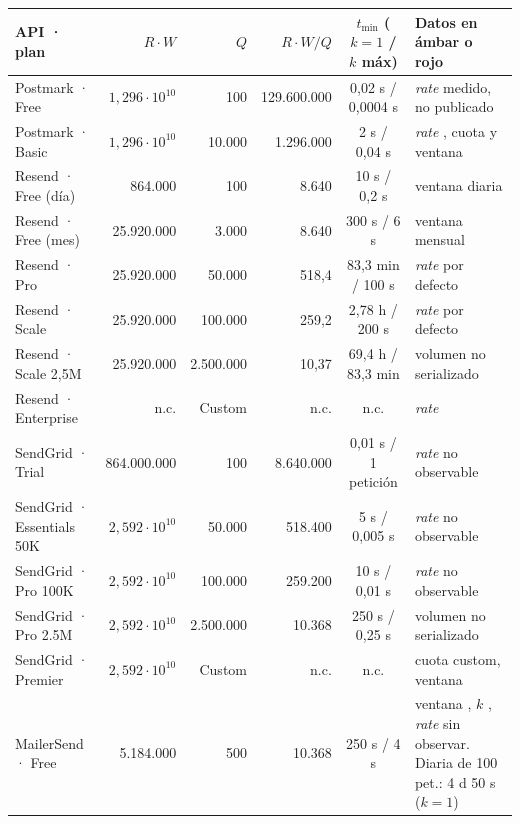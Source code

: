 \begin{table}[H]
\centering
\scriptsize
\setlength{\tabcolsep}{3pt}
\begin{tabular}{|l|r|r|r|c|p{3.2cm}|}
\hline
\textbf{API · plan} & \textbf{$R \cdot W$} & \textbf{$Q$} & \textbf{$R \cdot W / Q$} & \textbf{$t_{\min}$ ($k{=}1$ / $k$ máx)} & \textbf{Datos en ámbar o rojo} \\
\hline
Postmark · Free & $1{,}296 \cdot 10^{10}$ & 100 & 129.600.000 & 0,02 s / 0,0004 s & \textit{rate} medido, no publicado \semambar{} \\
\hline
Postmark · Basic & $1{,}296 \cdot 10^{10}$ & 10.000 & 1.296.000 & 2 s / 0,04 s & \textit{rate} \semambar{}, cuota y ventana \semambar{} \\
\hline
Resend · Free (día) & 864.000 & 100 & 8.640 & 10 s / 0,2 s & ventana diaria \semambar{} \\
\hline
Resend · Free (mes) & 25.920.000 & 3.000 & 8.640 & 300 s / 6 s & ventana mensual \semambar{} \\
\hline
Resend · Pro & 25.920.000 & 50.000 & 518,4 & 83,3 min / 100 s & \textit{rate} por defecto \\
\hline
Resend · Scale & 25.920.000 & 100.000 & 259,2 & 2,78 h / 200 s & \textit{rate} por defecto \\
\hline
Resend · Scale 2,5M & 25.920.000 & 2.500.000 & 10,37 & 69,4 h / 83,3 min & volumen no serializado \\
\hline
Resend · Enterprise & n.c. & Custom & n.c. & n.c. & \textit{rate} \semrojo{} \\
\hline
SendGrid · Trial & 864.000.000 & 100 & 8.640.000 & 0,01 s / 1 petición & \textit{rate} no observable \\
\hline
SendGrid · Essentials 50K & $2{,}592 \cdot 10^{10}$ & 50.000 & 518.400 & 5 s / 0,005 s & \textit{rate} no observable \\
\hline
SendGrid · Pro 100K & $2{,}592 \cdot 10^{10}$ & 100.000 & 259.200 & 10 s / 0,01 s & \textit{rate} no observable \\
\hline
SendGrid · Pro 2.5M & $2{,}592 \cdot 10^{10}$ & 2.500.000 & 10.368 & 250 s / 0,25 s & volumen no serializado \\
\hline
SendGrid · Premier & $2{,}592 \cdot 10^{10}$ & Custom & n.c. & n.c. & cuota custom, ventana \semambar{} \\
\hline
MailerSend · Free & 5.184.000 & 500 & 10.368 & 250 s / 4 s & ventana \semambar{}, $k$ \semambar{}, \textit{rate} sin observar. Diaria de 100 pet.: 4 d 50 s ($k{=}1$) \\

\end{tabular}
\end{table}
